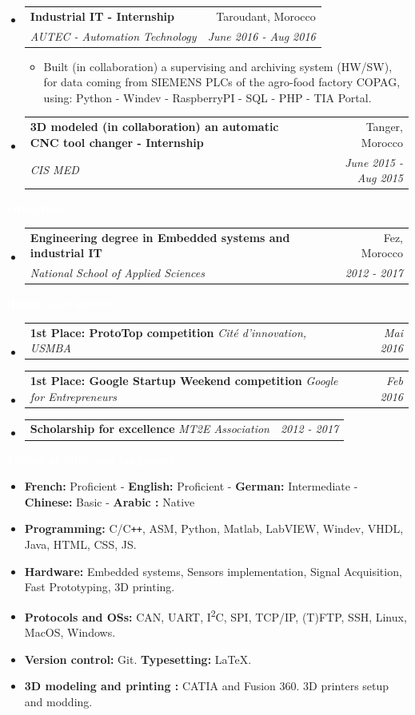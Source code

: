 \documentclass[a4paper, 10pt]{article}
\makeatletter
\newcommand{\resitem}[1]{\item #1 \vspace{-2pt}}
\newcommand{\resheading}[1]{{\large\colorbox{col}{\begin{minipage}{\textwidth\enskip}{\textcolor{white}{\textbf{#1 \vphantom{p\^{E}}}}}\end{minipage}}}\nolinebreak}
\newcommand{\ressubheading}[4]{
\begin{tabular*}{175mm}{l@{\extracolsep{\fill}}r}
		\textbf{#1} & #2 \\
		\textit{#3} & \textit{#4} \\
\end{tabular*}\vspace{-5pt}}
\newcommand{\ressubheadingbis}[3]{
\begin{tabular*}{175mm}{l@{\extracolsep{\fill}}r}
		\textbf{#1} \textit{#2} & \textit{#3} \\
\end{tabular*}\vspace{-4pt}}
\makeatother
\begin{document}
\begin{itemize}
\item
	\ressubheading{Industrial IT - Internship}{Taroudant, Morocco}{AUTEC - Automation Technology}{June 2016 - Aug 2016}
	\begin{itemize}
		\resitem{Built (in collaboration) a supervising and archiving system (HW/SW), for data coming from SIEMENS PLCs of the agro-food factory COPAG, using: Python - Windev - RaspberryPI - SQL - PHP - TIA Portal.}
	\end{itemize}
	
\item
	\ressubheading{3D modeled (in collaboration) an automatic CNC tool changer - Internship}{Tanger, Morocco}{CIS MED}{June 2015 - Aug 2015}
	
\end{itemize}

\resheading{Education}
\begin{itemize}
\item
	\ressubheading{Engineering degree in Embedded systems and industrial IT}
	{Fez, Morocco}{National School of Applied Sciences}{2012 - 2017}

\end{itemize}

\resheading{Honors and awards}
\begin{itemize}
\item\ressubheadingbis{1st Place: ProtoTop competition}
	{Cité d'innovation, USMBA}{Mai 2016}
\item\ressubheadingbis{1st Place: Google Startup Weekend competition}
	{Google for Entrepreneurs}{Feb 2016}
\item\ressubheadingbis{Scholarship for excellence}
	{MT2E Association}{2012 - 2017}
\end{itemize}

\resheading{Technical skills and languages}
\begin{itemize}
\item\textbf{French:} Proficient  -
\textbf{English:} Proficient  -
\textbf{German:} Intermediate  -
\textbf{Chinese:} Basic  -
\textbf{Arabic :} Native
\vspace{-4pt}
\item\textbf{Programming:}
C/C{}\verb!++!, ASM, Python, Matlab, LabVIEW, Windev, VHDL, Java, HTML, CSS, JS.
\vspace{-4pt}
\item\textbf{Hardware:}
Embedded systems, Sensors implementation, Signal Acquisition, Fast Prototyping, 3D printing.
\vspace{-4pt}
\item\textbf{Protocols and OSs:}
CAN, UART, I\textsuperscript{2}C, SPI, TCP/IP, (T)FTP, SSH, Linux, MacOS, Windows.
\vspace{-4pt}
\item\textbf{Version control:}
Git. \quad  
{\small\textbullet} \textbf{Typesetting: }
LaTeX.
\vspace{-4pt}
\item\textbf{3D modeling and printing :}
CATIA and Fusion 360. 3D printers setup and modding.
\end{itemize}
\end{document}
